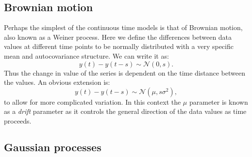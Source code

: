 \documentclass[a4paper,11pt,oneside,onecolumn]{book}
\begin{document}
\subsection{Brownian motion}

Perhaps the simplest of the continuous time models is that of Brownian motion, also known as a Weiner process. Here we define the differences between data values at different time points to be normally distributed with a very specific mean and autocovariance structure. We can write it as:
\[ y(t) - y(t-s) \sim \mathcal{N}(0,s). \]
Thus the change in value of the series is dependent on the time distance between the values. An obvious extension is:
\[ y(t) - y(t-s) \sim \mathcal{N}(\mu,s \sigma^2), \]
to allow for more complicated variation. In this context the $\mu$ parameter is known as a \textit{drift} parameter as it controls the general direction of the data values as time proceeds.



\subsection{Gaussian processes}
\end{document}

